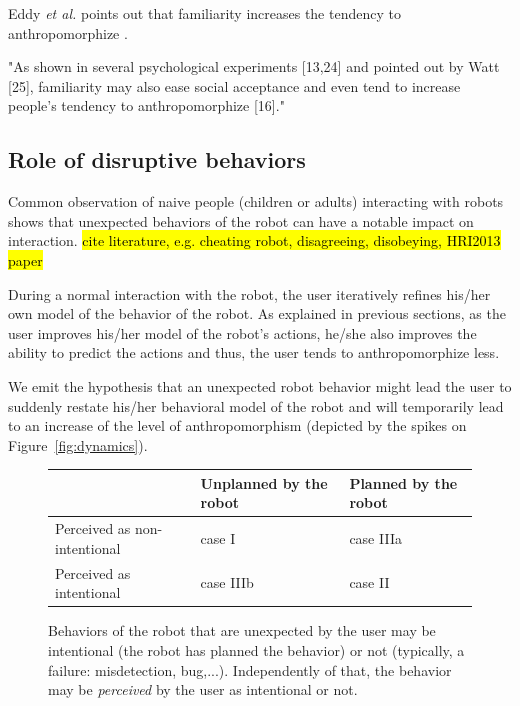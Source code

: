 \documentclass{frontiersSCNS} %
\begin{document}
Eddy \textit{et al.} points out that familiarity increases the tendency to
anthropomorphize \cite{eddy_attribution_1993}.

"As shown in several psychological experiments [13,24] and pointed out by Watt
[25], familiarity may also ease social acceptance and even tend to increase
people's tendency to anthropomorphize [16]." \cite{duffy_anthropomorphism_2003}


\subsection*{Role of disruptive behaviors}
\label{sec:disruptive}

Common observation of naive people (children or adults) interacting with robots
shows that unexpected behaviors of the robot can have a notable impact on
interaction. \hl{cite literature, e.g. cheating robot, disagreeing, disobeying,
HRI2013 paper}

During a normal interaction with the robot, the user iteratively refines his/her
own model of the behavior of the robot. As explained in previous sections, as
the user improves his/her model of the robot's actions, he/she also improves the
ability to predict the actions and thus, the user tends to anthropomorphize
less.

We emit the hypothesis that an unexpected robot behavior might lead the user to
suddenly restate his/her behavioral model of the robot and will temporarily lead
to an increase of the level of anthropomorphism (depicted by the spikes on
Figure~\ref{fig:dynamics}).



\begin{figure}\footnotesize
    \begin{tabular}{  >{\centering\arraybackslash}m{2cm} | >{\centering\arraybackslash}m{2cm} | >{\centering\arraybackslash}m{2cm} }
     & Unplanned by the robot & Planned by the robot \\ \hline
    Perceived as non-intentional & case I  & case IIIa  \\ \hline
    Perceived as intentional &  case IIIb & case II 
    \end{tabular}
\caption{
    Behaviors of the robot that are unexpected by the user may be intentional
    (the robot has planned the behavior) or not (typically, a failure:
    misdetection, bug,...). Independently of that, the behavior may be
    \emph{perceived} by the user as intentional or not.}
\label{fig:perceptionUnexpectedBehavior}
\end{figure}
\end{document}
